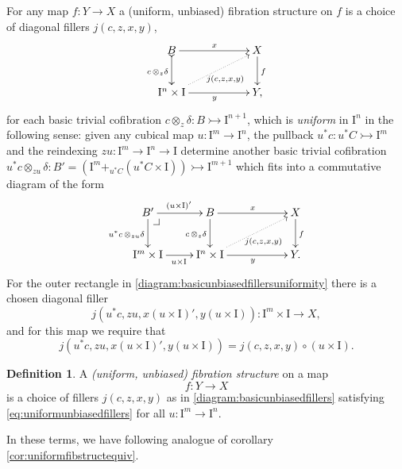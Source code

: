 \documentclass[11pt]{article}
\makeatletter
\newcommand{\pbcorner}[1][dr]{\save*!/#1-1.2pc/#1:(-1,1)@^{|-}\restore}
\newcommand{\mono}{\ensuremath{\rightarrowtail}}
\newcommand{\ra}{\ensuremath{\rightarrow}}
\newcommand{\I}{\ensuremath{\mathrm{I}}}
\theoremstyle{remark}
\theoremstyle{definition}
\newtheorem{definition}[theorem]{Definition}
\makeatother
\begin{document}
For any map $f:Y\ra X$  a  (uniform, unbiased) fibration structure on $f$ is a choice of diagonal fillers $j(c,z,x,y)$,
\begin{equation}\label{diagram:basicunbiasedfillers}
\xymatrix{
B \ar@{>->}[d]_{c\,\otimes_z\delta} \ar[rr]^x && X \ar[d]^f \\
\I^{n}\times \I \ar@{.>}[rru]_{j(c,z,x,y)} \ar[rr]_y && Y,
}
\end{equation}
for each basic trivial cofibration $c \otimes_z \delta : B \mono \I^{n+1}$, which is \emph{uniform} in $\I^n$ in the following sense: given any cubical map $u : \I^m \to \I^n$, the pullback $u^*c : u^*C\mono \I^m$ and the reindexing $zu : \I^m \to \I^n\to\I$ determine another basic trivial cofibration $u^*c \otimes_{zu} \delta : B' = (\I^m +_{u^*C} (u^*C\times\I)) \mono \I^{m+1}$ which fits into a commutative diagram of the form
\begin{equation}\label{diagram:basicunbiasedfillersuniformity}
\xymatrix{
B' \ar[d]_{u^*c\,\otimes_{zu}\delta} \ar[r]^{(u\times \I)'} \pbcorner  & B \ar[d]_{c\,\otimes_z\delta} \ar[rr]^x && X \ar[d]^f \\
\I^{m}\times \I  \ar[r]_{u\times \I} & \I^{n}\times \I \ar@{.>}[rru]_{j(c,z,x,y)} \ar[rr]_y && Y.
}
\end{equation}
For the outer rectangle in \eqref{diagram:basicunbiasedfillersuniformity} there is a chosen diagonal filler 
$$j(u^*c,zu,x(u\times \I)', y(u\times \I)): \I^m\times\I\to X,$$ and for this map we require that
\begin{equation}\label{eq:uniformunbiasedfillers}
j(u^*c,zu,x(u\times \I)', y(u\times \I)) = j(c,z,x,y)\circ (u\times \I).
\end{equation}

\begin{definition}\label{def:unbiasedfibstructure} A \emph{(uniform, unbiased) fibration structure} on a map $$f: Y\to X$$ is a choice of fillers $j(c,z,x,y)$ as in \eqref{diagram:basicunbiasedfillers} satisfying \eqref{eq:uniformunbiasedfillers} for all $u : \I^m\ra\I^n$.
\end{definition}

In these terms, we have following analogue of corollary \ref{cor:uniformfibstructequiv}.
\end{document}
